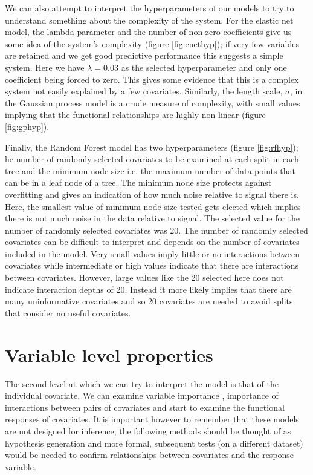 \documentclass[12pt,]{article}
\begin{document}
We can also attempt to interpret the hyperparameters of our models to try to understand something about the complexity of the system.
For the elastic net model, the lambda parameter and the number of non-zero coefficients give us some idea of the system's complexity (figure \ref{fig:enethyp}); if very few variables are retained and we get good predictive performance this suggests a simple system.
Here we have \(\lambda = 0.03\) as the selected hyperparameter and only one coefficient being forced to zero.
This gives some evidence that this is a complex system not easily explained by a few covariates.
Similarly, the length scale, \(\sigma\), in the Gaussian process model is a crude measure of complexity, with small values implying that the functional relationships are highly non linear (figure \ref{fig:gphyp}).

Finally, the Random Forest model has two hyperparameters (figure \ref{fig:rfhyp}); he number of randomly selected covariates to be examined at each split in each tree and the minimum node size i.e. the maximum number of data points that can be in a leaf node of a tree.
The minimum node size protects against overfitting and gives an indication of how much noise relative to signal there is.
Here, the smallest value of minimum node size tested gets elected which implies there is not much noise in the data relative to signal.
The selected value for the number of randomly selected covariates was 20.
The number of randomly selected covariates can be difficult to interpret and depends on the number of covariates included in the model.
Very small values imply little or no interactions between covariates while intermediate or high values indicate that there are interactions between covariates.
However, large values like the 20 selected here does not indicate interaction depths of 20.
Instead it more likely implies that there are many uninformative covariates and so 20 covariates are needed to avoid splits that consider no useful covariates.

\section{Variable level properties}\label{variable-level-properties}

The second level at which we can try to interpret the model is that of the individual covariate.
We can examine variable importance \citep{oppel2009alternative}, importance of interactions between pairs of covariates and start to examine the functional responses of covariates.
It is important however to remember that these models are not designed for inference; the following methods should be thought of as hypothesis generation and more formal, subsequent tests (on a different dataset) would be needed to confirm relationships between covariates and the response variable.
\end{document}
